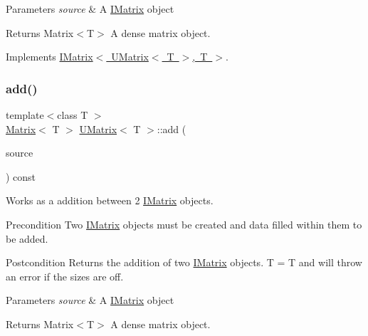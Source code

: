 \begin{DoxyParams}{Parameters}
{\em source} & A \mbox{\hyperlink{class_i_matrix}{I\+Matrix}} object \\
\hline
\end{DoxyParams}
\begin{DoxyReturn}{Returns}
Matrix$<$\+T$>$ A dense matrix object. 
\end{DoxyReturn}


Implements \mbox{\hyperlink{class_i_matrix_a661dc43bb607b98c28414cdd49bc64f7}{I\+Matrix$<$ U\+Matrix$<$ T $>$, T $>$}}.

\mbox{\label{class_u_matrix_ae57a66445e3d0e1a49e1f7a241a6b9ba}} 
\subsubsection{\texorpdfstring{add()}{add()}\hspace{0.1cm}{\footnotesize\ttfamily [5/6]}}
{\footnotesize\ttfamily template$<$class T $>$ \\
\mbox{\hyperlink{class_matrix}{Matrix}}$<$ T $>$ \mbox{\hyperlink{class_u_matrix}{U\+Matrix}}$<$ T $>$\+::add (\begin{DoxyParamCaption}\item[{const \mbox{\hyperlink{class_i_matrix}{I\+Matrix}}$<$ \mbox{\hyperlink{class_s_matrix}{S\+Matrix}}$<$ T $>$, T $>$ \&}]{source }\end{DoxyParamCaption}) const}



Works as a addition between 2 \mbox{\hyperlink{class_i_matrix}{I\+Matrix}} objects. 

\begin{DoxyPrecond}{Precondition}
Two \mbox{\hyperlink{class_i_matrix}{I\+Matrix}} objects must be created and data filled within them to be added. 
\end{DoxyPrecond}
\begin{DoxyPostcond}{Postcondition}
Returns the addition of two \mbox{\hyperlink{class_i_matrix}{I\+Matrix}} objects. T = T and will throw an error if the sizes are off.
\end{DoxyPostcond}

\begin{DoxyParams}{Parameters}
{\em source} & A \mbox{\hyperlink{class_i_matrix}{I\+Matrix}} object \\
\hline
\end{DoxyParams}
\begin{DoxyReturn}{Returns}
Matrix$<$\+T$>$ A dense matrix object. 
\end{DoxyReturn}
\mbox{\label{class_u_matrix_a547418e355299d72e50f3cd0991c21a1}} 
